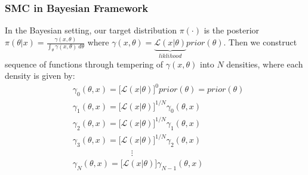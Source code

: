 \documentclass[aspectratio=169]{beamer}\usepackage[utf8]{inputenc}
\begin{document}
\begin{frame}\frametitle{SMC in Bayesian Framework}
In the Bayesian setting, our target distribution $\pi(\cdot)$ is the posterior $\pi(\theta|x) = \frac{\gamma(x, \theta)}{\int_\theta \gamma (x,\theta) \ d\theta} $ where $\gamma(x, \theta)= \underbrace{\mathcal{L}(x|\theta)}_{liklihood} prior(\theta)$. Then we construct  sequence of functions through tempering of $\gamma(x, \theta)$ into $N$ densities, where each density is given by:
\begin{equation}
\begin{split}
&\gamma_0 (\theta , x) =  \Big[ \mathcal{L} (x|\theta) \Big]^0  prior(\theta)  = prior (\theta) \\
&\gamma_1 (\theta , x) =  \Big[\mathcal{L} (x|\theta) \Big]^{1/N}\gamma_0 (\theta , x)   \\
&\gamma_2 (\theta , x) =  \Big[ \mathcal{L} (x|\theta) \Big]^{1/N}\gamma_1 (\theta , x) \\
&\gamma_3(\theta , x) =  \Big[ \mathcal{L} (x|\theta) \Big]^{1/N}\gamma_2 (\theta , x) \\
&  \quad \quad  \quad  \quad  \quad  \quad  \quad \vdots \\
&\gamma_N(\theta , x) =  \Big[ \mathcal{L} (x|\theta) \Big] \gamma_{N-1} (\theta , x) \\
\end{split}
\end{equation}

\end{frame}
\end{document}
